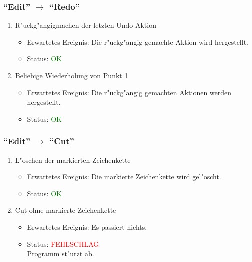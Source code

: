 \subsubsection{"`Edit"' $\rightarrow$ "`Redo"'}
\begin{enumerate}
\item R"uckg"angigmachen der letzten Undo-Aktion
\begin{itemize}
\item Erwartetes Ereignis: Die r"uckg"angig gemachte Aktion wird hergestellt. 
\item Status: \textcolor{green}{OK}
\end{itemize}
\item Beliebige Wiederholung von Punkt 1
\begin{itemize}
\item Erwartetes Ereignis: Die r"uckg"angig gemachten Aktionen werden hergestellt. 
\item Status: \textcolor{green}{OK}
\end{itemize}
\end{enumerate}
\subsubsection{"`Edit"' $\rightarrow$ "`Cut"'}
\begin{enumerate}
\item L"oschen der markierten Zeichenkette
\begin{itemize}
\item Erwartetes Ereignis: Die markierte Zeichenkette wird gel"oscht. 
\item Status: \textcolor{green}{OK}
\end{itemize}
\item Cut ohne markierte Zeichenkette
\begin{itemize}
\item Erwartetes Ereignis: Es passiert nichts. 
\item Status: \textcolor{red}{FEHLSCHLAG} \\
Programm st"urzt ab.
\end{itemize}
\end{enumerate}
